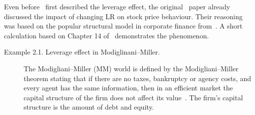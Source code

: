 Even before~\citet{black1976studies} first described the leverage effect, the original~\citet{black1973pricing} paper already discussed the impact of changing LR on stock price behaviour.
Their reasoning was based on the popular structural model in corporate finance from~\citet{modigliani1958cost}.
A short calculation based on Chapter 14 of~\citet{berk2007corporate} demonstrates the phenomenon.
\begin{description}
	\item[Example 2.1. Leverage effect in Modiglinani--Miller.]
	
	The Modigliani--Miller (MM) world is defined by the Modigliani--Miller theorem stating that if there are no taxes, bankruptcy or agency costs, and every agent has the same information, then in an efficient market the capital structure of the firm does not affect its value~\citep{modigliani1958cost}.
	The firm's capital structure is the amount of debt and equity.
	

\end{description}

